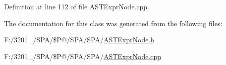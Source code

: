 Definition at line 112 of file A\-S\-T\-Expr\-Node.\-cpp.



The documentation for this class was generated from the following files\-:\begin{DoxyCompactItemize}
\item 
F\-:/3201\-\_/\-S\-P\-A/\$\-P@/\-S\-P\-A/\-S\-P\-A/\hyperlink{_a_s_t_expr_node_8h}{A\-S\-T\-Expr\-Node.\-h}\item 
F\-:/3201\-\_/\-S\-P\-A/\$\-P@/\-S\-P\-A/\-S\-P\-A/\hyperlink{_a_s_t_expr_node_8cpp}{A\-S\-T\-Expr\-Node.\-cpp}\end{DoxyCompactItemize}
